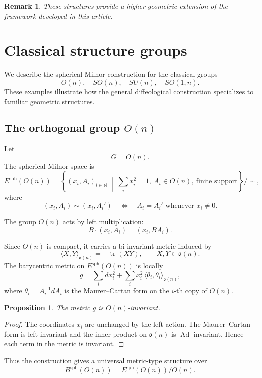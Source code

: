 \documentclass[11pt]{amsart}
\newtheorem{proposition}[theorem]{Proposition}
\newtheorem{remark}[theorem]{Remark}
\begin{document}
\begin{remark}
These structures provide a higher-geometric extension of the framework developed in this article.
\end{remark}
\section{Classical structure groups}
\label{sec:classical-groups}

We describe the spherical Milnor construction for the classical groups
\[
O(n),\quad SO(n),\quad SU(n),\quad SO(1,n).
\]
These examples illustrate how the general diffeological construction specializes to familiar geometric structures.

\subsection{The orthogonal group \(O(n)\)}

Let
\[
G=O(n).
\]
The spherical Milnor space is
\[
E^{\mathrm{sph}}(O(n))
=
\left\{
(x_i,A_i)_{i\in\mathbb N}
\;\middle|\;
\sum_i x_i^2=1,\ A_i\in O(n),\ \text{finite support}
\right\}/\sim,
\]
where
\[
(x_i,A_i)\sim (x_i,A_i')
\quad\Longleftrightarrow\quad
A_i=A_i'
\text{ whenever }x_i\neq0.
\]

The group \(O(n)\) acts by left multiplication:
\[
B\cdot (x_i,A_i)=(x_i,BA_i).
\]

Since \(O(n)\) is compact, it carries a bi-invariant metric induced by
\[
\langle X,Y\rangle_{\mathfrak o(n)}
=
-\operatorname{tr}(XY),
\qquad
X,Y\in\mathfrak o(n).
\]
The barycentric metric on \(E^{\mathrm{sph}}(O(n))\) is locally
\[
g
=
\sum_i dx_i^2
+
\sum_i x_i^2\,\langle \theta_i,\theta_i\rangle_{\mathfrak o(n)},
\]
where \(\theta_i=A_i^{-1}dA_i\) is the Maurer--Cartan form on the \(i\)-th copy of \(O(n)\).

\begin{proposition}
The metric \(g\) is \(O(n)\)-invariant.
\end{proposition}

\begin{proof}
The coordinates \(x_i\) are unchanged by the left action. The Maurer--Cartan form is left-invariant and the inner product on \(\mathfrak o(n)\) is \(\operatorname{Ad}\)-invariant. Hence each term in the metric is invariant.
\end{proof}

Thus the construction gives a universal metric-type structure over
\[
B^{\mathrm{sph}}(O(n))
=
E^{\mathrm{sph}}(O(n))/O(n).
\]
\end{document}
